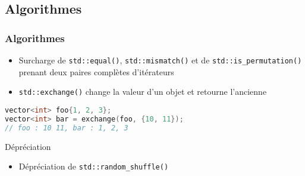\documentclass[C++.tex]{subfiles}
\begin{document}
\subsection*{Algorithmes}
\begin{frame}[fragile]
	\frametitle{Algorithmes}
	\begin{itemize}
		\item Surcharge de \lstinline|std::equal()|, \lstinline|std::mismatch()| et de \lstinline|std::is_permutation()| prenant deux paires complètes d'itérateurs


		\item \lstinline|std::exchange()| change la valeur d'un objet et retourne l'ancienne

	\end{itemize}

	\begin{lstlisting}[language=C++]
vector<int> foo{1, 2, 3};
vector<int> bar = exchange(foo, {10, 11});
// foo : 10 11, bar : 1, 2, 3\end{lstlisting}

	\begin{block}{Dépréciation}
		\begin{itemize}
			\item Dépréciation de \lstinline|std::random_shuffle()|
		\end{itemize}

	\end{block}
\end{frame}
\end{document}
